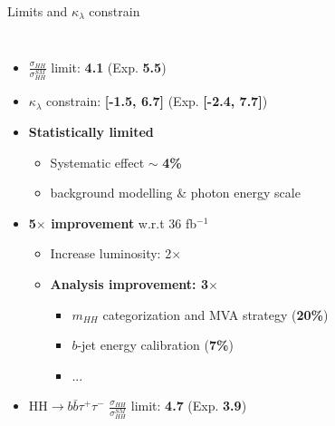 \begin{frame}{Limits and $\kappa_{\lambda}$ constrain}
\begin{columns}
\begin{itemize}
    \item $\frac{\sigma_{HH}}{\sigma_{HH}^{SM}}$ limit: \textbf{\textcolor{HHred}{4.1}} (Exp. \textbf{5.5}) 
    \item $\kappa_{\lambda}$ constrain: \textbf{\textcolor{HHred}{[-1.5, 6.7]}} (Exp. \textbf{[-2.4, 7.7]})
    \pause
    \item \textbf{Statistically limited}
    \begin{itemize}
        \item Systematic effect $\sim$ \textbf{4\%}
        \item background modelling \& photon energy scale
    \end{itemize}
    \pause
    \item \textbf{\textcolor{cadmiumorange}{5$\times$ improvement}} w.r.t 36 fb$^{-1}$
    \begin{itemize}
        \item Increase luminosity: 2$\times$
        \item \textbf{\textcolor{HHturquoise_d}{Analysis improvement: 3$\times$}}
        \begin{itemize}
            \item$m_{HH}$ categorization and MVA strategy (\textbf{20\%})
            \item $b$-jet energy calibration (\textbf{7\%})
            \item ...
        \end{itemize}
    \end{itemize}
    \pause
    \item HH$\to b\bar{b}\tau^+\tau^-$ $\frac{\sigma_{HH}}{\sigma_{HH}^{SM}}$ limit: \textcolor{HHred}{\textbf{4.7}} (Exp. \textbf{3.9})
\end{itemize}
\end{columns}
\end{frame}

